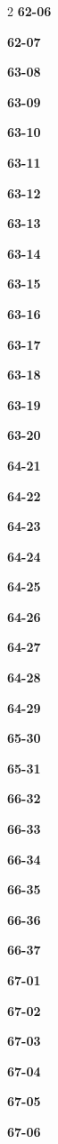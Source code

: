 \documentclass[10pt,a4paper]{article}
\begin{document}
\begin{multicols}{2}
\noindent\textbf{62-06}\ \par
\noindent\textbf{62-07}\ \par
\noindent\textbf{63-08}\ \par
\noindent\textbf{63-09}\ \par
\noindent\textbf{63-10}\ \par
\noindent\textbf{63-11}\ \par
\noindent\textbf{63-12}\ \par
\noindent\textbf{63-13}\ \par
\noindent\textbf{63-14}\ \par
\noindent\textbf{63-15}\ \par
\noindent\textbf{63-16}\ \par
\noindent\textbf{63-17}\ \par
\noindent\textbf{63-18}\ \par
\noindent\textbf{63-19}\ \par
\noindent\textbf{63-20}\ \par
\noindent\textbf{64-21}\ \par
\noindent\textbf{64-22}\ \par
\noindent\textbf{64-23}\ \par
\noindent\textbf{64-24}\ \par
\noindent\textbf{64-25}\ \par
\noindent\textbf{64-26}\ \par
\noindent\textbf{64-27}\ \par
\noindent\textbf{64-28}\ \par
\noindent\textbf{64-29}\ \par
\noindent\textbf{65-30}\ \par
\noindent\textbf{65-31}\ \par
\noindent\textbf{66-32}\ \par
\noindent\textbf{66-33}\ \par
\noindent\textbf{66-34}\ \par
\noindent\textbf{66-35}\ \par
\noindent\textbf{66-36}\ \par
\noindent\textbf{66-37}\ \par
\noindent\textbf{67-01}\ \par
\noindent\textbf{67-02}\ \par
\noindent\textbf{67-03}\ \par
\noindent\textbf{67-04}\ \par
\noindent\textbf{67-05}\ \par
\noindent\textbf{67-06}\ \par

\end{multicols}
\end{document}
